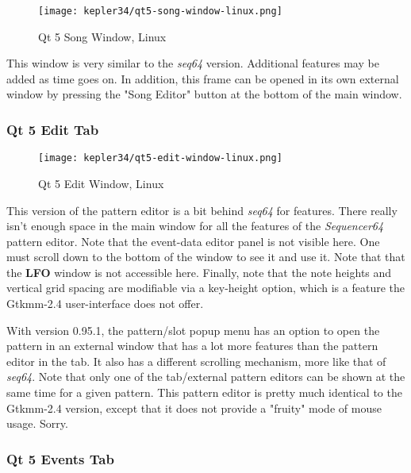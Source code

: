 \begin{figure}[H]
   \centering 
   \texttt{[image: kepler34/qt5-song-window-linux.png]}
   \caption{Qt 5 Song Window, Linux}
   \label{fig:qt5_song_window_linux}
\end{figure}

   This window is very similar to the \textsl{seq64} version.
   Additional features may be added as time goes on.  In addition,
   this frame can be opened in its own external window by
   pressing the "Song Editor" button at the bottom of the main window.

\subsubsection{Qt 5 Edit Tab}
\label{subsubsec:qt_portmidi_qt5_edit_tab}

\begin{figure}[H]
   \centering 
   \texttt{[image: kepler34/qt5-edit-window-linux.png]}
   \caption{Qt 5 Edit Window, Linux}
   \label{fig:qt5_edit_window_linux}
\end{figure}

   This version of the pattern editor is a bit behind
   \textsl{seq64} for features.  There really isn't enough space in the
   main window for all the features of the \textsl{Sequencer64} pattern editor.
   Note that the event-data editor panel is not visible here.
   One must scroll down to the bottom of the window to see it and use it.
   Note that that the \textbf{LFO} window is not accessible here.
   Finally, note that the note heights and vertical grid spacing are
   modifiable via a key-height option, which is a feature the Gtkmm-2.4
   user-interface does not offer.

   With version 0.95.1, the pattern/slot popup menu has an option to open the
   pattern in an external window that has a lot more features than the
   pattern editor in the tab.  It also has a different scrolling mechanism,
   more like that of \textsl{seq64}.
   Note that only one of the tab/external pattern
   editors can be shown at the same time for a given pattern.
   This pattern editor is pretty much identical to the Gtkmm-2.4 version,
   except that it does not provide a "fruity" mode of mouse usage.
   Sorry.

\subsubsection{Qt 5 Events Tab}
\label{subsubsec:qt_portmidi_qt5_events_tab}

